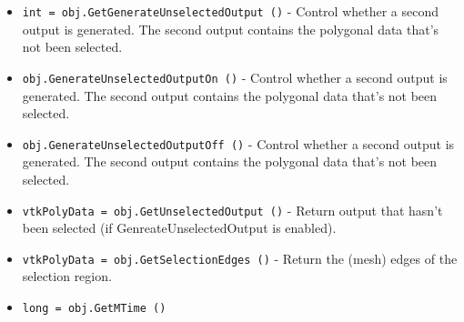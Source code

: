 \begin{itemize}
\item  \verb|int = obj.GetGenerateUnselectedOutput ()| -  Control whether a second output is generated. The second output
 contains the polygonal data that's not been selected.

\item  \verb|obj.GenerateUnselectedOutputOn ()| -  Control whether a second output is generated. The second output
 contains the polygonal data that's not been selected.

\item  \verb|obj.GenerateUnselectedOutputOff ()| -  Control whether a second output is generated. The second output
 contains the polygonal data that's not been selected.

\item  \verb|vtkPolyData = obj.GetUnselectedOutput ()| -  Return output that hasn't been selected (if GenreateUnselectedOutput is
 enabled).

\item  \verb|vtkPolyData = obj.GetSelectionEdges ()| -  Return the (mesh) edges of the selection region.

\item  \verb|long = obj.GetMTime ()|

\end{itemize}
